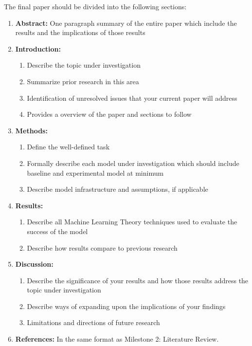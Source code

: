 The final paper should be divided into the following sections:
\begin{enumerate}
    \item \textbf{Abstract:} One paragraph summary of the entire paper which include the results and the implications of those results
    \item \textbf{Introduction:}
    \begin{enumerate}
        \item Describe the topic under investigation
        \item Summarize prior research in this area
        \item Identification of unresolved issues that your current paper will address
        \item Provides a overview of the paper and sections to follow
    \end{enumerate}
    \item \textbf{Methods:}
    \begin{enumerate}
        \item Define the well-defined task
        \item Formally describe each model under investigation which should include baseline and experimental model at minimum
        \item Describe model infrastructure and assumptions, if applicable
    \end{enumerate}
    \item \textbf{Results:}
    \begin{enumerate}
        \item Describe all Machine Learning Theory techniques used to evaluate the success of the model
        \item Describe how results compare to previous research
    \end{enumerate}
    \item \textbf{Discussion:}
    \begin{enumerate}
        \item Describe the significance of your results and how those results address the topic under investigation
        \item Describe ways of expanding upon the implications of your findings
        \item Limitations and directions of future research
    \end{enumerate}
    \item \textbf{References:} In the same format as Milestone 2: Literature Review.
\end{enumerate}

